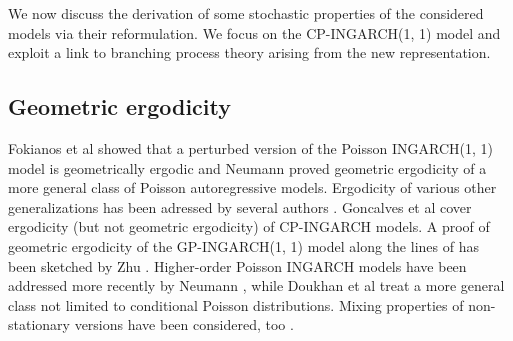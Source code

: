 \documentclass[review]{elsarticle}
\begin{document}
We now discuss the derivation of some stochastic properties of the considered models via their reformulation. We focus on the CP-INGARCH(1, 1) model and exploit a link to branching process theory arising from the new representation.

\subsection{Geometric ergodicity}

Fokianos et al \cite{Fokianos2009} showed that a perturbed version of the Poisson INGARCH(1, 1) model is geometrically ergodic and Neumann \cite[Theorem 3.1]{Neumann2011} proved geometric ergodicity of a more general class of Poisson autoregressive models. Ergodicity of various other generalizations has been adressed by several authors \citep{Davis2016, Douc2013, Neumann2011}. Goncalves et al \citep{Goncalves2015} cover ergodicity (but not geometric ergodicity) of CP-INGARCH models. A proof of geometric ergodicity of the GP-INGARCH(1, 1) model along the lines of \cite{Neumann2011} has been sketched by Zhu \citep{Zhu2012}. Higher-order Poisson INGARCH models have been addressed more recently by Neumann \citep{Neumann2021}, while Doukhan et al \citep{Doukhan2021} treat a more general class not limited to conditional Poisson distributions. Mixing properties of non-stationary versions have been considered, too \cite{Doukhan2021a}. %
\end{document}
